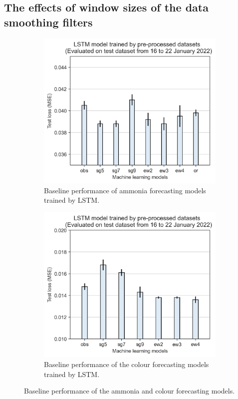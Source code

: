 \subsection{The effects of window sizes of the data smoothing filters}

\begin{figure}[!ht]
  \centering
  \begin{subfigure}[t]{0.75\textwidth}
    \includegraphics[width=\linewidth]{imgs/results/feature-engineering/pre-processing-nh3-jan.png}
    \caption{Baseline performance of ammonia forecasting models trained by LSTM.} \label{fig:preprocessing-nh3}
  \end{subfigure}
  \hspace{3em}
  \begin{subfigure}[t]{0.75\textwidth}
    \includegraphics[width=\linewidth]{imgs/results/feature-engineering/pre-processing-colour.png}
    \caption{Baseline performance of the colour forecasting models trained by LSTM.} \label{fig:preprocessing-colour}
  \end{subfigure}
\caption{Baseline performance of the ammonia and colour forecasting models.} \label{fig:preprocessing-comparison}
\end{figure}

